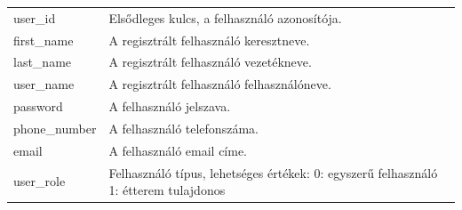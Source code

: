 \begin{tabular}{|l|l|}
\hline
user\_id & Elsődleges kulcs, a felhasználó azonosítója. \\
first\_name & A regisztrált felhasználó keresztneve. \\
last\_name & A regisztrált felhasználó vezetékneve. \\
user\_name & A regisztrált felhasználó felhasználóneve. \\
password & A felhasználó jelszava. \\
phone\_number & A felhasználó telefonszáma. \\
email & A felhasználó email címe. \\
user\_role & Felhasználó típus, lehetséges értékek: 0: egyszerű felhasználó 1: étterem tulajdonos \\
\hline
\end{tabular}
